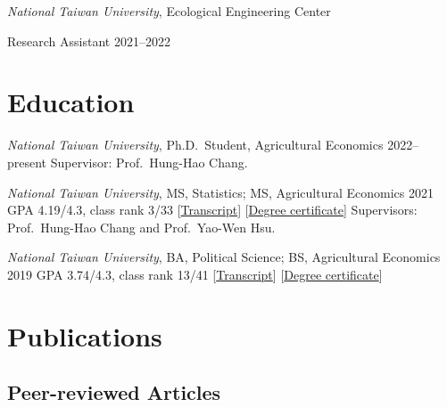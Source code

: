 \documentclass[11pt,letterpaper]{article}
\begin{document}
\emph{National Taiwan University}, Ecological Engineering Center

Research Assistant \hfill \mbox{2021--2022}

\section{Education}\label{education}

\emph{National Taiwan University}, Ph.D.~Student, Agricultural Economics
\hfill \mbox{2022--present} \newline Supervisor: Prof.~Hung-Hao Chang.

\emph{National Taiwan University}, MS, Statistics; MS, Agricultural
Economics \hfill 2021 \newline GPA 4.19/4.3, class rank 3/33
{[}\href{https://yyliou.github.io/yyliou/cv/doc/ms-transcript.pdf}{Transcript}{]}
{[}\href{https://yyliou.github.io/yyliou/cv/doc/ms-certificate.pdf}{Degree
certificate}{]} \newline Supervisors: Prof.~Hung-Hao Chang and
Prof.~Yao-Wen Hsu.

\emph{National Taiwan University}, BA, Political Science; BS,
Agricultural Economics \hfill 2019 \newline GPA 3.74/4.3, class rank
13/41
{[}\href{https://yyliou.github.io/yyliou/cv/doc/bs-transcript.pdf}{Transcript}{]}
{[}\href{https://yyliou.github.io/yyliou/cv/doc/bs-certificate.pdf}{Degree
certificate}{]}

\section{Publications}\label{publications}

\subsection{Peer-reviewed Articles}\label{peer-reviewed-articles}
\end{document}
